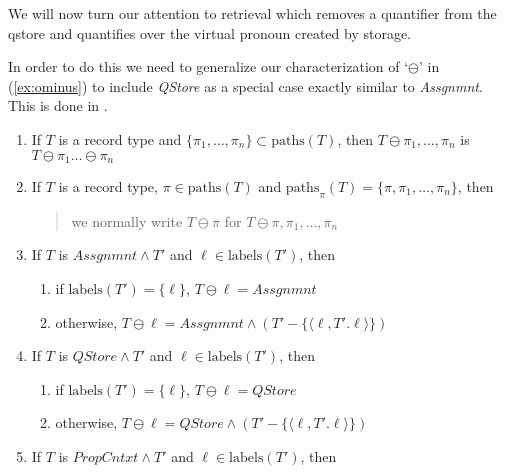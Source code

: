 We will now turn our attention to retrieval which removes a quantifier
from the qstore and quantifies over the virtual pronoun created by
storage.


\begin{shaded}
In order to do this we need to generalize our
characterization of `$\ominus$' in (\ref{ex:ominus}) to include
\textit{QStore} as a special case exactly similar to
\textit{Assgnmnt}.  This is done in \nexteg{}.
\begin{ex} 
  \begin{enumerate}
    
  \item If $T$ is a record type and
    $\{\pi_1,\ldots,\pi_n\}\subset\mathrm{paths}(T)$, then
    $T\ominus\pi_1,\ldots,\pi_n$ is $T\ominus\pi_1\ldots\ominus\pi_n$
 
\item If $T$ is a record type, $\pi\in\mathrm{paths}(T)$ and
  $\mathrm{paths}_\pi(T)=\{\pi,\pi_1,\ldots,\pi_n\}$, then
  \begin{quote}
    we normally write $T\ominus\pi$ for
    $T\ominus\pi,\pi_1,\ldots,\pi_n$
  \end{quote}
  
 
\item If $T$ is $\textit{Assgnmnt}\wedge T'$ and
  $\ell\in\mathrm{labels}(T')$, then
  \begin{enumerate} 
    
  \item if $\mathrm{labels}(T')=\{\ell\}$, $T\ominus\ell=\textit{Assgnmnt}$ 
    
  \item otherwise, $T\ominus\ell=\textit{Assgnmnt}\wedge (T'-\{\langle\ell,T'.\ell\rangle\})$ 
    
  \end{enumerate}

\item If $T$ is $\textit{QStore}\wedge T'$ and
  $\ell\in\mathrm{labels}(T')$, then
  \begin{enumerate} 
    
  \item if $\mathrm{labels}(T')=\{\ell\}$, $T\ominus\ell=\textit{QStore}$ 
    
  \item otherwise, $T\ominus\ell=\textit{QStore}\wedge (T'-\{\langle\ell,T'.\ell\rangle\})$ 
    
  \end{enumerate}
  
\item If $T$ is $\textit{PropCntxt}\wedge T'$ and
  $\ell\in\mathrm{labels}(T')$, then
  \begin{enumerate} 
    

\end{enumerate}
\end{enumerate}
\end{ex}
\end{shaded}
